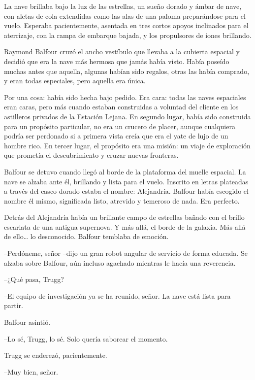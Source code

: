 
{La nave brillaba bajo la luz de las estrellas, un sueño dorado y ámbar
 de nave, con aletas de cola extendidas como las alas de una paloma
 preparándose para el vuelo. Esperaba pacientemente, asentada en tres
 cortos apoyos inclinados para el aterrizaje, con la rampa de embarque
bajada, y los propulsores de iones brillando.}

{Raymond Balfour cruzó el ancho vestíbulo que llevaba a la cubierta
 espacial y decidió que era la nave más hermosa que jamás había visto.
 Había poseído muchas antes que aquella, algunas habían sido regalos,
 otras las había comprado, y eran todas especiales, pero aquella era
única.}

{Por una cosa: había sido hecha bajo pedido. Era cara: todas las naves
 espaciales eran caras, pero más cuando estaban construidas a voluntad
 del cliente en los astilleros privados de la Estación Lejana. En segundo
 lugar, había sido construida para un propósito particular, no era un
 crucero de placer, aunque cualquiera podría ser perdonado si a primera
 vista creía que era el yate de lujo de un hombre rico. En tercer lugar,
 el propósito era una misión: un viaje de exploración que prometía el
descubrimiento y cruzar nuevas fronteras.}

{Balfour se detuvo cuando llegó al borde de la plataforma del muelle
 espacial. La nave se alzaba ante él, brillando y lista para el vuelo.
 Inscrito en letras plateadas a través del casco dorado estaba el nombre:
 Alejandría. Balfour había escogido el nombre él mismo, significada
listo, atrevido y temeroso de nada. Era perfecto.}

{Detrás del Alejandría había un brillante campo de estrellas bañado con
 el brillo escarlata de una antigua supernova. Y más allá, el borde de la
 galaxia. Más allá de ello\ldots{} lo desconocido. Balfour temblaba de
emoción.}

{--Perdóneme, señor --dijo un gran robot angular de servicio de forma
 educada. Se alzaba sobre Balfour, aún incluso agachado mientras le hacía
una reverencia.}

{--¿Qué pasa, Trugg?}

{--El equipo de investigación ya se ha reunido, señor. La nave está lista
para partir.}

{Balfour asintió.}

{--Lo sé, Trugg, lo sé. Solo quería saborear el momento.}

{Trugg se enderezó, pacientemente.}

{--Muy bien, señor.}


